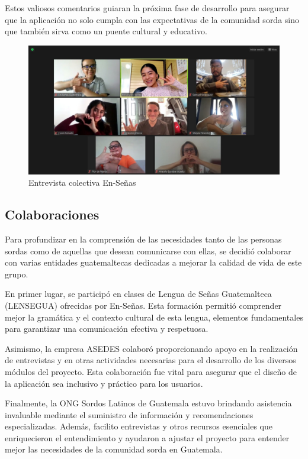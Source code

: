 Estos valiosos comentarios guiaran la próxima fase de desarrollo para asegurar que la aplicación no solo cumpla con las expectativas de la comunidad sorda sino que también sirva como un puente cultural y educativo.


\begin{figure} [H]
    \centering
    \includegraphics[width=0.75\linewidth]{figuras/entrevista_colectiva.png}
    \caption{Entrevista colectiva En-Señas}
    \label{fig:enter-label}
\end{figure}



\subsection{Colaboraciones}

Para profundizar en la comprensión de las necesidades tanto de las personas sordas como de aquellas que desean comunicarse con ellas, se decidió colaborar con varias entidades guatemaltecas dedicadas a mejorar la calidad de vida de este grupo.

En primer lugar, se participó en clases de Lengua de Señas Guatemalteca (LENSEGUA) ofrecidas por En-Señas. Esta formación permitió comprender mejor la gramática y el contexto cultural de esta lengua, elementos fundamentales para garantizar una comunicación efectiva y respetuosa.

Asimismo, la empresa ASEDES colaboró proporcionando apoyo en la realización de entrevistas y en otras actividades necesarias para el desarrollo de los diversos módulos del proyecto. Esta colaboración fue vital para asegurar que el diseño de la aplicación sea inclusivo y práctico para los usuarios.

Finalmente, la ONG Sordos Latinos de Guatemala estuvo brindando asistencia invaluable mediante el suministro de información y recomendaciones especializadas. Además, facilito entrevistas y otros recursos esenciales que enriquecieron el entendimiento y ayudaron a ajustar el proyecto para entender mejor las necesidades de la comunidad sorda en Guatemala.

